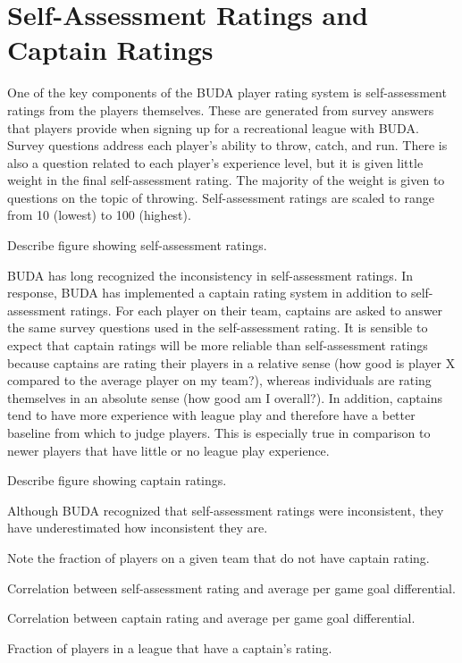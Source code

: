 \section{Self-Assessment Ratings and Captain Ratings}\label{sec:self_rating}

One of the key components of the BUDA player rating system is self-assessment ratings from the players themselves.  These are generated from survey answers that players provide when signing up for a recreational league with BUDA. Survey questions address each player's ability to throw, catch, and run.  There is also a question related to each player's experience level, but it is given little weight in the final self-assessment rating. The majority of the weight is given to questions on the topic of throwing. Self-assessment ratings are scaled to range from 10 (lowest) to 100 (highest).

Describe figure showing self-assessment ratings.

BUDA has long recognized the inconsistency in self-assessment ratings.  In response, BUDA has implemented a captain rating system in addition to self-assessment ratings.  For each player on their team, captains are asked to answer the same survey questions used in the self-assessment rating.  It is sensible to expect that captain ratings will be more reliable than self-assessment ratings because captains are rating their players in a relative sense (how good is player X compared to the average player on my team?), whereas individuals are rating themselves in an absolute sense (how good am I overall?). In addition, captains tend to have more experience with league play and therefore have a better baseline from which to judge players. This is especially true in comparison to newer players that have little or no league play experience.

Describe figure showing captain ratings.

Although BUDA recognized that self-assessment ratings were inconsistent, they have underestimated how inconsistent they are. 

Note the fraction of players on a given team that do not have captain rating.

Correlation between self-assessment rating and average per game goal differential.

Correlation between captain rating and average per game goal differential.

Fraction of players in a league that have a captain's rating.